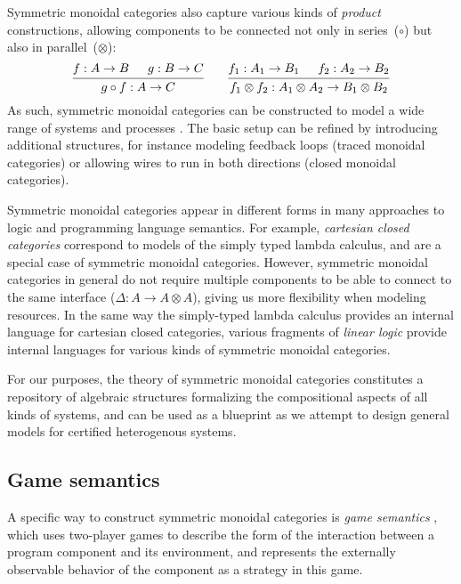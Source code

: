 \documentclass[11pt,oneside,draft]{book}
\theoremstyle{definition}
\begin{document}
Symmetric monoidal categories
also capture various kinds of \emph{product} constructions,
allowing components to be connected
not only in series~($\circ$)
but also in parallel~($\otimes$):
\[
  \begin{prooftree}
    \hypo{f : A \rightarrow B}
    \hypo{g : B \rightarrow C}
    \infer2{g \circ f : A \rightarrow C}
  \end{prooftree}
  \qquad
  \begin{prooftree}
    \hypo{f_1 : A_1 \rightarrow B_1}
    \hypo{f_2 : A_2 \rightarrow B_2}
    \infer2{f_1 \otimes f_2 : A_1 \otimes A_2 \rightarrow B_1 \otimes B_2}
  \end{prooftree}
\]
As such,
symmetric monoidal categories can be constructed
to model
a wide range of systems and processes \citep{rosetta}.
The basic setup can be refined by introducing additional structures,
for instance modeling
feedback loops (traced monoidal categories) or allowing
wires to run in both directions
(closed monoidal categories).

Symmetric monoidal categories appear in different forms
in many approaches to logic and programming language semantics.
For example,
\emph{cartesian closed categories}
correspond
to models of the simply typed lambda calculus,
and are a special case of symmetric monoidal categories.
However,
symmetric monoidal categories in general do not require
multiple components to be able to connect to the same interface
($\Delta : A \rightarrow A \otimes A$),
giving us more flexibility when modeling resources.
In the same way the simply-typed lambda calculus provides
an internal language for cartesian closed categories,
various fragments of \emph{linear logic} provide
internal languages for various kinds of symmetric monoidal categories.

For our purposes,
the theory of symmetric monoidal categories
constitutes a repository of algebraic structures
formalizing the compositional aspects of
all kinds of systems,
and can be used as a blueprint
as we attempt to design general models
for certified heterogenous systems.


\subsection{Game semantics} %

A specific way to construct symmetric monoidal categories
is \emph{game semantics} \citep{cspgs},
which uses two-player games to describe
the form of the interaction between a program component and its environment,
and represents the externally observable behavior
of the component as a strategy in this game.
\end{document}
